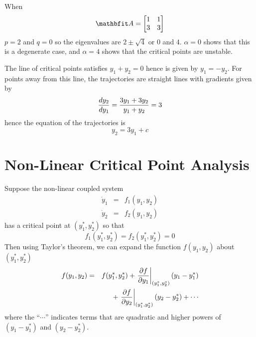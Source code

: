 \begin{example}
When 
$$\vect{A}=\begin{bmatrix} 1 & 1 \\ 3 & 3 \end{bmatrix}$$
$p=2$ and $q=0$ so
the eigenvalues are $2\pm\sqrt{4}$ or $0$ and $4$.  $\alpha=0$ shows that
this is a degenerate case, and $\alpha=4$ shows that the critical points are
unstable.

The line of critical points satisfies $y_1+y_2=0$ hence is given by
$y_1=-y_2$.  For points away from this line, the trajectories are straight
lines with gradients given by
$$\frac{dy_2}{dy_1}=\frac{3y_1+3y_2}{y_1+y_2}=3$$
hence the equation of the trajectories is
$$y_2=3y_1+c$$

\begin{center}
\end{center}
\end{example}

\section{Non-Linear Critical Point Analysis}

Suppose the non-linear coupled system
\begin{eqnarray*}
\dot{y}_1&=&f_1(y_1,y_2)\\
\dot{y}_2&=&f_2(y_1,y_2)
\end{eqnarray*}
has a critical point at $(y_1^*,y_2^*)$ so that
$$f_1(y_1^*,y_2^*)=f_2(y_1^*,y_2^*)=0$$
Then using Taylor's theorem, we can expand the function $f(y_1,y_2)$ about
$(y_1^*,y_2^*)$
\begin{eqnarray*}
f(y_1,y_2)&=&f(y_1^*,y_2^*)
+\left.\frac{\partial f}{\partial y_1}\right|_{(y_1^*,y_2^*)}(y_1-y_1^*)\\
&&{}+\left.\frac{\partial f}{\partial y_2}\right|_{(y_1^*,y_2^*)}(y_2-y_2^*)+\cdots
\end{eqnarray*}
where the ``$\cdots$'' indicates terms that are quadratic and higher powers
of $(y_1-y_1^*)$ and $(y_2-y_2^*)$.

